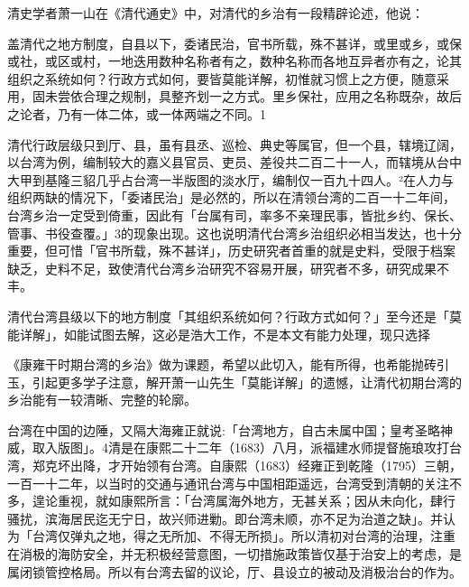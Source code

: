 
清史学者萧一山在《清代通史》中，对清代的乡治有一段精辟论述，他说：

\begin{BookQuote}
盖清代之地方制度，自县以下，委诸民治，官书所载，殊不甚详，或里或乡，或保或社，或区或村，一地迭用数种名称者有之，数种名称而各地互异者亦有之，论其组织之系统如何？行政方式如何，要皆莫能详解，初惟就习惯上之方便，随意采用，固未尝依合理之规制，具整齐划一之方式。里乡保社，应用之名称既杂，故后之论者，乃有一体二体，或一体两端之不同。1
\end{BookQuote}

清代行政层级只到厅、县，虽有县丞、巡检、典史等属官，但一个县，辖境辽阔，以台湾为例，编制较大的嘉义县官员、吏员、差役共二百二十一人，而辖境从台中大甲到基隆三貂几乎占台湾一半版图的淡水厅，编制仅一百九十四人。²在人力与组织两缺的情况下，「委诸民治」是必然的，所以在清领台湾的二百一十二年间，台湾乡治一定受到倚重，因此有「台属有司，率多不亲理民事，皆批乡约、保长、管事、书役查覆。」3的现象出现。这也说明清代台湾乡治组织必相当发达，也十分重要，但可惜「官书所载，殊不甚详」，历史研究者首重的就是史料，受限于档案缺乏，史料不足，致使清代台湾乡治研究不容易开展，研究者不多，研究成果不丰。

清代台湾县级以下的地方制度「其组织系统如何？行政方式如何？」至今还是「莫能详解」，如能试图去解，这必是浩大工作，不是本文有能力处理，现只选择

\vfill
\begin{BookNotes}
\end{BookNotes}

\noindent 《康雍干时期台湾的乡治》做为课题，希望以此切入，能有所得，也希能抛砖引玉，引起更多学子注意，解开萧一山先生「莫能详解」的遗憾，让清代初期台湾的乡治能有一较清晰、完整的轮廓。


台湾在中国的边陲，又隔大海雍正就说:「台湾地方，自古未属中国；皇考圣略神威，取入版图」。4清是在康熙二十二年（1683）八月，派福建水师提督施琅攻打台湾，郑克坏出降，才开始领有台湾。自康熙（1683）经雍正到乾隆（1795）三朝，一百一十二年，以当时的交通与通讯台湾与中国相距遥远，台湾受到清朝的关注不多，遑论重视，就如康熙所言：「台湾属海外地方，无甚关系；因从未向化，肆行骚扰，滨海居民迄无宁日，故兴师进勦。即台湾未顺，亦不足为治道之缺」。并认为「台湾仅弹丸之地，得之无所加、不得无所损」。所以清初对台湾的治理，注重在消极的海防安全，并无积极经营意图，一切措施政策皆仅基于治安上的考虑，是属闭锁管控格局。所以有台湾去留的议论，厅、县设立的被动及消极治台的作为。

